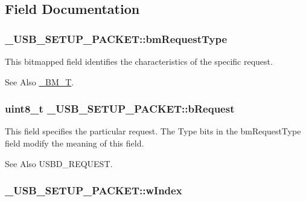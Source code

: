 \subsection{Field Documentation}
\hypertarget{struct__USB__SETUP__PACKET_ac3379b5aabd08a8d980fe8d030f5d6a8}{
\subsubsection[{bm\-Request\-Type}]{ \-\_\-\-U\-S\-B\-\_\-\-S\-E\-T\-U\-P\-\_\-\-P\-A\-C\-K\-E\-T\-::bm\-Request\-Type}}\label{struct__USB__SETUP__PACKET_ac3379b5aabd08a8d980fe8d030f5d6a8}
This bitmapped field identifies the characteristics of the specific request. \begin{DoxySeeAlso}{See Also}
\hyperlink{struct__BM__T}{\-\_\-\-B\-M\-\_\-\-T}. 
\end{DoxySeeAlso}
\hypertarget{struct__USB__SETUP__PACKET_a95f462f8491a38e7ee662dcd95d5cb6a}{
\subsubsection[{b\-Request}]{\setlength{\rightskip}{0pt plus 5cm}uint8\-\_\-t \-\_\-\-U\-S\-B\-\_\-\-S\-E\-T\-U\-P\-\_\-\-P\-A\-C\-K\-E\-T\-::b\-Request}}\label{struct__USB__SETUP__PACKET_a95f462f8491a38e7ee662dcd95d5cb6a}
This field specifies the particular request. The Type bits in the bm\-Request\-Type field modify the meaning of this field. \begin{DoxySeeAlso}{See Also}
U\-S\-B\-D\-\_\-\-R\-E\-Q\-U\-E\-S\-T. 
\end{DoxySeeAlso}
\hypertarget{struct__USB__SETUP__PACKET_a1f0ec0c931efe4a96d92b3ceea80b2a3}{
\subsubsection[{w\-Index}]{ \-\_\-\-U\-S\-B\-\_\-\-S\-E\-T\-U\-P\-\_\-\-P\-A\-C\-K\-E\-T\-::w\-Index}}\label{struct__USB__SETUP__PACKET_a1f0ec0c931efe4a96d92b3ceea80b2a3}
